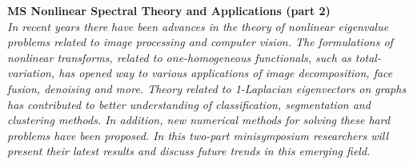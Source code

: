   \noindent\textbf{MS Nonlinear Spectral Theory and Applications (part 2)}\\
  \textit{In recent years there have been advances in the theory of nonlinear eigenvalue problems related to image processing and computer vision. The formulations of nonlinear transforms, related to one-homogeneous functionals, such as total-variation, has opened way to various applications of image decomposition, face fusion, denoising and more. Theory related to 1-Laplacian eigenvectors on graphs has contributed to better understanding of classification, segmentation and clustering methods. In addition, new numerical methods for solving these hard problems have been proposed.
In this two-part minisymposium researchers will present their latest results and discuss future trends in this emerging field.} \\
    
